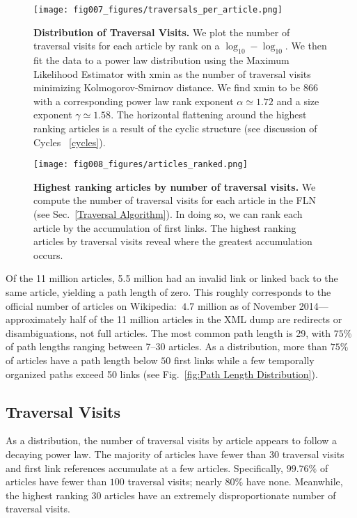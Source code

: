 \documentclass[pre,twocolumn,twoside,superscriptaddress,floatfix]{revtex4-1}
\begin{document}
{\begin{figure}[tp!]
  \texttt{[image: fig007\_figures/traversals\_per\_article.png]} 
  \caption{
    \textbf{Distribution of Traversal Visits.}
    We plot the number of traversal visits for each article by rank on a $\log_{10}-\log_{10}$. We then fit the data to a power law 
    distribution using the Maximum Likelihood Estimator with xmin as the number of traversal visits minimizing Kolmogorov-Smirnov distance. We find xmin to be 866 with a corresponding power law rank exponent $\alpha \simeq 1.72$ and a size exponent $\gamma \simeq 1.58$.
The horizontal flattening around the highest
ranking articles is a result of the cyclic structure (see discussion of Cycles ~\ref{cycles}).
}
  \label{fig:Distribution of Visits}
\end{figure}

\begin{figure}[tp!]
  \texttt{[image: fig008\_figures/articles\_ranked.png]}
  \caption{
    \textbf{Highest ranking articles by number of traversal visits.}
We compute the number of traversal visits for each article in the FLN (see 
Sec.~\ref{Traversal Algorithm}). 
In doing so, we can rank each article by the accumulation of first links.
The highest ranking articles by traversal visits reveal where the greatest accumulation occurs.}
  \label{fig:highest visits}
\end{figure}
Of the 11 million articles, 5.5 million had an invalid link or linked back to the same article, yielding a path length of zero. 
This roughly corresponds to the official number of articles on Wikipedia: 
$~4.7$ million as of November 2014---approximately half of the 11 million 
articles in the XML dump are redirects or disambiguations, not full articles.
The most common path length is 29, with $75\%$ of path lengths ranging between 7--30 articles.
As a distribution, more than $75\%$ of articles have a path length below 
$50$ first links 
while a few temporally organized paths exceed 50 links 
(see Fig.~\ref{fig:Path Length Distribution}). 

\subsection{Traversal Visits}

As a distribution, the number of traversal visits by article appears to follow a decaying power law. 
The majority of articles have fewer than 30 traversal visits and
first link references accumulate at a few articles.
Specifically, $99.76\%$ of articles have fewer than $100$ traversal visits; nearly $80\%$ have none. 
Meanwhile, the highest ranking 30 articles have an extremely disproportionate number of traversal visits.

}
\end{document}
